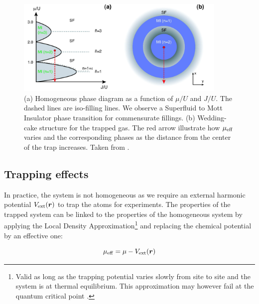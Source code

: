 \begin{figure}
    \centering
    \includegraphics[width=0.9\textwidth]{Fig/Chapter2/mott_lobes.png}
    \caption[Homogeneous phase diagram as a function of $\mu/U$ and $J/U$ and wedding-cake structure for the trapped gas]{(a) Homogeneous phase diagram as a function of $\mu/U$ and $J/U$. The dashed lines are iso-filling lines. We observe a Superfluid to Mott Insulator phase transition for commensurate fillings. (b) Wedding-cake structure for the trapped gas. The red arrow illustrate how $\mu_{\rm{eff}}$ varies and the corresponding phases as the distance from the center of the trap increases. Taken from \cite{bloch2008many}.}
    \label{fig:mott_lobes}
\end{figure}


\subsection{Trapping effects}

\label{sec:ch2_trapping_effects}

In practice, the system is not homogeneous as we require an external harmonic potential $V_{\rm{ext}}(\bm{r})$ to trap the atoms for experiments. The properties of the trapped system can be linked to the properties of the homogeneous system by applying the Local Density Approximation\footnote{Valid as long as the trapping potential varies slowly from site to site and the system is at thermal equilibrium. This approximation may however fail at the quantum critical point \cite{pollet2012recent}.} \cite{bergkvist2004local} and replacing the chemical potential by an effective one:

\begin{equation}
    \mu_{\rm{eff}}= \mu - V_{\rm{ext}}(\bm{r})
\end{equation}

